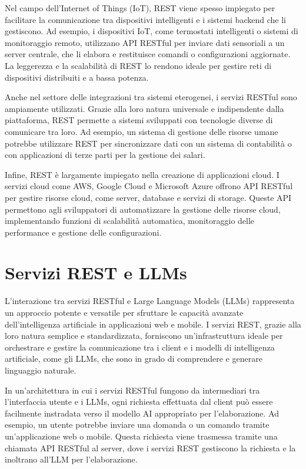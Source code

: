 \documentclass[a4paper,twoside,12pt]{toptesi}
\begin{document}
Nel campo dell'Internet of Things (IoT), REST viene spesso impiegato per facilitare la comunicazione tra dispositivi intelligenti e i sistemi backend che li gestiscono. Ad esempio, i dispositivi IoT, come termostati intelligenti o sistemi di monitoraggio remoto, utilizzano API RESTful per inviare dati sensoriali a un server centrale, che li elabora e restituisce comandi o configurazioni aggiornate. La leggerezza e la scalabilità di REST lo rendono ideale per gestire reti di dispositivi distribuiti e a bassa potenza.

Anche nel settore delle integrazioni tra sistemi eterogenei, i servizi RESTful sono ampiamente utilizzati. Grazie alla loro natura universale e indipendente dalla piattaforma, REST permette a sistemi sviluppati con tecnologie diverse di comunicare tra loro. Ad esempio, un sistema di gestione delle risorse umane potrebbe utilizzare REST per sincronizzare dati con un sistema di contabilità o con applicazioni di terze parti per la gestione dei salari.

Infine, REST è largamente impiegato nella creazione di applicazioni cloud. I servizi cloud come AWS, Google Cloud e Microsoft Azure offrono API RESTful per gestire risorse cloud, come server, database e servizi di storage. Queste API permettono agli sviluppatori di automatizzare la gestione delle risorse cloud, implementando funzioni di scalabilità automatica, monitoraggio delle performance e gestione delle configurazioni.

\section{Servizi REST e LLMs}

L'interazione tra servizi RESTful e Large Language Models (LLMs) rappresenta un approccio potente e versatile per sfruttare le capacità avanzate dell'intelligenza artificiale in applicazioni web e mobile. I servizi REST, grazie alla loro natura semplice e standardizzata, forniscono un'infrastruttura ideale per orchestrare e gestire la comunicazione tra i client e i modelli di intelligenza artificiale, come gli LLMs, che sono in grado di comprendere e generare linguaggio naturale.

In un'architettura in cui i servizi RESTful fungono da intermediari tra l'interfaccia utente e i LLMs, ogni richiesta effettuata dal client può essere facilmente instradata verso il modello AI appropriato per l'elaborazione. Ad esempio, un utente potrebbe inviare una domanda o un comando tramite un'applicazione web o mobile. Questa richiesta viene trasmessa tramite una chiamata API RESTful al server, dove i servizi REST gestiscono la richiesta e la inoltrano all'LLM per l'elaborazione.
\end{document}

